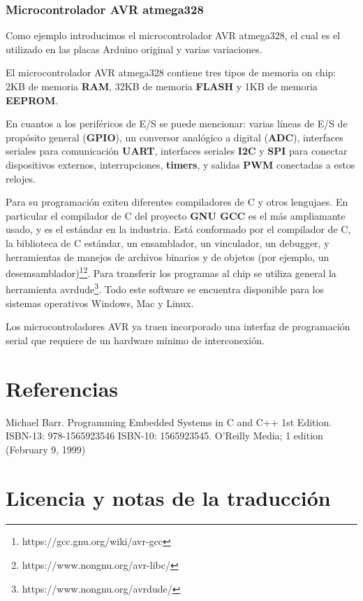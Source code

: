 \documentclass[output=paper, 
colorlinks,
citecolor=brown,
newtxmath
]{langscibook}
\begin{document}
\subsubsection*{Microcontrolador AVR atmega328}
Como ejemplo introducimos el microcontrolador AVR atmega328, 
el cual es el utilizado en las placas Arduino original
y varias variaciones. 

El microcontrolador AVR atmega328 contiene tres tipos de memoria on chip: 
2KB de memoria \textbf{RAM}, 32KB de memoria \textbf{FLASH} y 1KB de memoria \textbf{EEPROM}.

En cuantos a los periféricos de E/S se puede mencionar:
varias líneas de E/S de propósito general (\textbf{GPIO}), un conversor
analógico a digital (\textbf{ADC}), interfaces seriales para comunicación 
\textbf{UART}, interfaces seriales \textbf{I2C} y \textbf{SPI} para conectar 
dispositivos externos, interrupciones, \textbf{timers}, y 
salidas \textbf{PWM} conectadas a estos relojes.

Para su programación exiten diferentes compiladores de C
y otros lengujaes. En particular el compilador de C
del proyecto \textbf{GNU GCC} es el más ampliamante usado,
y es el estándar en la industria. Está conformado
por el compilador de C, la biblioteca de C estándar,
un ensamblador, un vinculador, un debugger, y herramientas de 
manejos de archivos binarios y de objetos (por ejemplo,
un desemsamblador)\footnote{https://gcc.gnu.org/wiki/avr-gcc}\footnote{https://www.nongnu.org/avr-libc/}. Para transferir los programas al 
chip se utiliza general la herramienta avrdude\footnote{https://www.nongnu.org/avrdude/}.
Todo este software se encuentra disponible para los sistemas
operativos Windows, Mac y Linux.

Los microcontroladores AVR ya traen incorporado una interfaz
de programación serial que requiere de un hardware mínimo
de interconexión.





\pagebreak

\section{Referencias}

Michael Barr. Programming Embedded Systems in C and C++ 1st Edition. ISBN-13: 978-1565923546
ISBN-10: 1565923545. O'Reilly Media; 1 edition (February 9, 1999)


\section*{Licencia y notas de la traducción}
\end{document}
